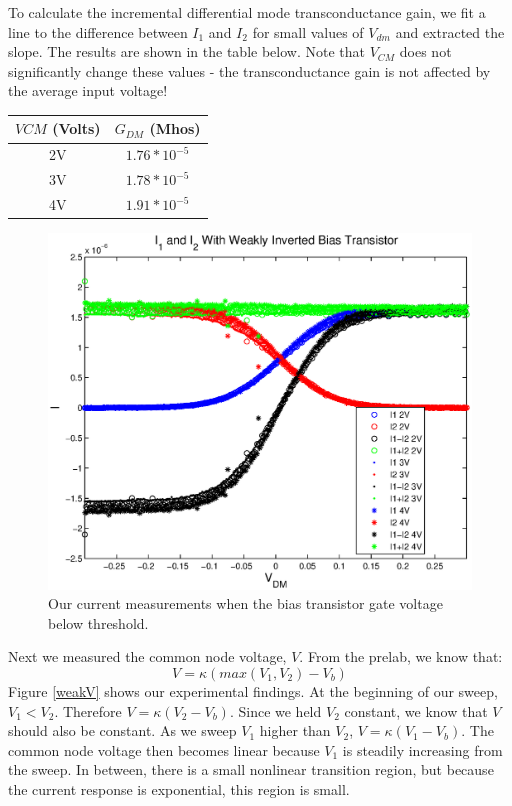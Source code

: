 \documentclass{article}
\begin{document}
To calculate the incremental differential mode transconductance gain, we fit a line to the difference between $I_1$ and $I_2$ for small values of $V_{dm}$ and extracted the slope. The results are shown in the table below. Note that $V_{CM}$ does not significantly change these values - the transconductance gain is not affected by the average input voltage!
\\
\begin{center}
\begin{tabular} {|c|c|}
\hline
$V{CM}$ (Volts) & $G_{DM}$ (Mhos) \\ 
\hline
2V & $1.76 *10^{-5}$ \\
3V & $1.78 *10^{-5}$ \\
4V & $1.91 *10^{-5}$ \\
\hline
\end{tabular}

\end{center}

\begin{figure}[H]
\centering
\includegraphics[scale=.8]{currents_weak.eps}
\caption{Our current measurements when the bias transistor gate voltage below threshold.}
\label{weak}
\end{figure}

Next we measured the common node voltage, $V$. From the prelab, we know that: \[V= \kappa (max(V_1,V_2)-V_b)\]
Figure \ref{weakV} shows our experimental findings. At the beginning of our sweep, $V_1<V_2$. Therefore $V=\kappa(V_2-V_b)$. Since we held $V_2$ constant, we know that $V$ should also be constant. As we sweep $V_1$ higher than $V_2$, $V=\kappa(V_1-V_b)$. The common node voltage then becomes linear because $V_1$ is steadily increasing from the sweep. In between, there is a small nonlinear transition region, but because the current response is exponential, this region is small.
\end{document}
